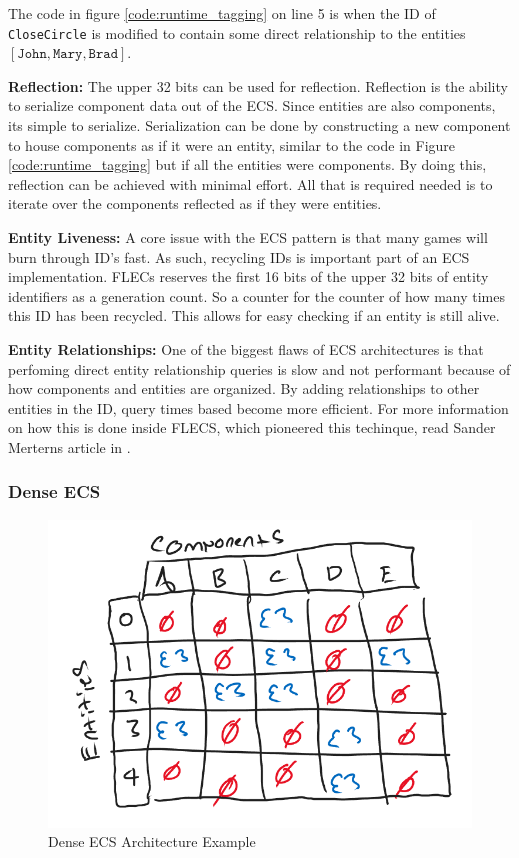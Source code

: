 The code in figure \ref{code:runtime_tagging} on line 5 is when the ID of \texttt{CloseCircle} is modified to contain some direct relationship to the entities $[\texttt{John}, \texttt{Mary}, \texttt{Brad}]$.

\textbf{Reflection:}
The upper 32 bits can be used for reflection. Reflection is the ability to serialize component data out of the ECS. Since entities are also components, its simple to serialize. Serialization can be done by constructing a new component to house components as if it were an entity, similar to the code in Figure \ref{code:runtime_tagging} but if all the entities were components. By doing this, reflection can be achieved with minimal effort. All that is required needed is to iterate over the components reflected as if they were entities.

\textbf{Entity Liveness:}
A core issue with the ECS pattern is that many games will burn through ID's fast. As such, recycling IDs is important part of an ECS implementation. FLECs reserves the first 16 bits of the upper 32 bits of entity identifiers as a generation count. So a counter for the counter of how many times this ID has been recycled. This allows for easy checking if an entity is still alive.  

\textbf{Entity Relationships:}
One of the biggest flaws of ECS architectures is that perfoming direct entity relationship queries is slow and not performant because of how components and entities are organized. By adding relationships to other entities in the ID, query times based become more efficient. For more information on how this is done inside FLECS, which pioneered this techinque, read Sander Merterns article in \cite{SanderMertensEntityIDs}.

\subsubsection{Dense ECS}
\begin{figure}[htbp]
    \centering
    \includegraphics[width=0.5\linewidth]{resources/dense_ecs.png}
    \caption{Dense ECS Architecture Example}
    \label{fig:dense_ecs}
\end{figure}

